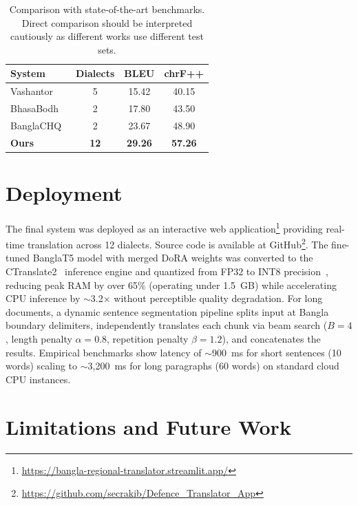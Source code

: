 \documentclass[conference]{IEEEtran}
\begin{document}
\begin{table}[t]
\centering
\caption{Comparison with state-of-the-art benchmarks. Direct comparison should be interpreted cautiously as different works use different test sets.}
\label{tab:sota}
\small
\begin{tabular}{lccc}
\toprule
\textbf{System} & \textbf{Dialects} & \textbf{BLEU} & \textbf{chrF++} \\
\midrule
Vashantor~\cite{faria2025vashantor}     & 5  & 15.42 & 40.15 \\
BhasaBodh~\cite{bhuiyan2025bhasabodh}   & 2  & 17.80 & 43.50 \\
BanglaCHQ~\cite{mahjabin2025banglachq}  & 2  & 23.67 & 48.90 \\
\rowcolor{gray!15} \textbf{Ours}        & \textbf{12} & \textbf{29.26} & \textbf{57.26} \\
\bottomrule
\end{tabular}
\end{table}

\section{Deployment}

The final system was deployed as an interactive web application\footnote{\url{https://bangla-regional-translator.streamlit.app/}} providing real-time translation across 12 dialects. Source code is available at GitHub\footnote{\url{https://github.com/secrakib/Defence_Translator_App}}. The fine-tuned BanglaT5 model with merged DoRA weights was converted to the CTranslate2~\cite{klein-etal-2017-opennmt} inference engine and quantized from FP32 to INT8 precision~\cite{Jacob_2018_CVPR}, reducing peak RAM by over 65\% (operating under 1.5~GB) while accelerating CPU inference by $\sim$3.2$\times$ without perceptible quality degradation. For long documents, a dynamic sentence segmentation pipeline splits input at Bangla boundary delimiters, independently translates each chunk via beam search ($B{=}4$, length penalty $\alpha{=}0.8$, repetition penalty $\beta{=}1.2$), and concatenates the results. Empirical benchmarks show latency of $\sim$900~ms for short sentences (10 words) scaling to $\sim$3,200~ms for long paragraphs (60 words) on standard cloud CPU instances.

\section{Limitations and Future Work}
\end{document}
